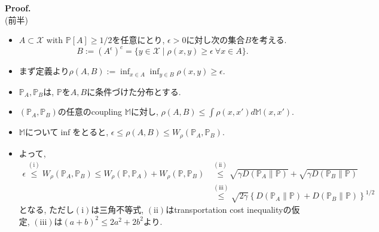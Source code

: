 \documentclass[aspectratio=169, dvipdfmx]{beamer}
\newcommand{\bb}{\mathbb}
\newcommand{\cc}{\mathcal}
\begin{document}
\begin{frame}{}{}
{\bf Proof.}\\
{(前半)}
\begin{itemize}
    \item $A \subset \cc{X}$ with $\bb{P}[A]\ge 1/2$を任意にとり,
    $\epsilon >0$に対し次の集合$B$を考える.
    \[
        B := (A^\epsilon)^c = \{ y \in \cc{X} \mid \rho(x,y)\ge \epsilon \ \forall x \in A \}.
    \]
    \item まず定義より$\rho(A, B) := \inf_{x\in A}\inf_{y \in B} \rho(x,y) \ge \epsilon$.
    \item $\bb{P}_A, \bb{P}_B$は, $\bb{P}$を$A, B$に条件づけた分布とする.
    \item $(\bb{P}_A, \bb{P}_B)$の任意のcoupling $\bb{M}$に対し, $\rho(A, B) \le \int \rho(x, x')d\bb{M}(x, x')$.
    \item $\bb{M}$について$\inf$をとると, $\epsilon \le \rho(A, B) \le W_\rho(\bb{P}_A,\bb{P}_B)$.
    \item よって,      
        \begin{align*}
            \epsilon
            \stackrel{\mathrm{(i)}}{\leq} W_{\rho}\left(\mathbb{P}_{A}, \mathbb{P}_{B}\right)
            \leq W_{\rho}\left(\mathbb{P}, \mathbb{P}_{A}\right)+W_{\rho}\left(\mathbb{P}, \mathbb{P}_{B}\right)
            & \stackrel{\mathrm{(ii)}}{\leq}\sqrt{\gamma D\left(\mathbb{P}_{A} \| \mathbb{P}\right)}+\sqrt{\gamma D\left(\mathbb{P}_{B} \| \mathbb{P}\right)} \\
            & \stackrel{\mathrm{(iii)}}{\leq}\sqrt{2 \gamma}\left\{D\left(\mathbb{P}_{A} \| \mathbb{P}\right)+D\left(\mathbb{P}_{B} \| \mathbb{P}\right)\right\}^{1 / 2}
          \end{align*}
          となる,
          ただし$\mathrm{(i)}$は三角不等式,
          $\mathrm{(ii)}$はtransportation cost inequalityの仮定,
          $\mathrm{(iii)}$は$(a+b)^2 \le 2a^2+2b^2$より.
\end{itemize}
\end{frame}
\end{document}
